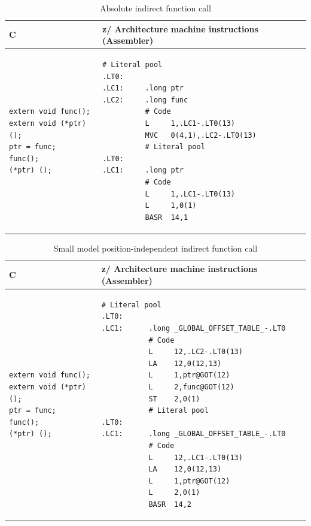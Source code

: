 \documentclass[USenglish,fontsize=11pt,twoside,%
  toc=bib,toc=idx,toc=graduated,numbers=noendperiod,
  bookmarks=true,
  bookmarksnumbered=true,
  bookmarksopen=true,
  bookmarksopenlevel=1,
  breaklinks=true,
  colorlinks=true,
  linkcolor=black,
  pdfpagelayout={TwoPageRight},
  pdfusetitle=true
]{scrreprt}
\newcommand{\ARCH}{z/\kern-1pt Ar\-chi\-tec\-ture}
\newcommand{\ARCH}{ESA/390}
\newenvironment{DIFnomarkup}{}{} %
\begin{document}
\ifzseries\else
\begin{table}
  \centering
  \begin{DIFnomarkup}
  \begin{tabular}{p{}p{}}
    \toprule
    C & \ARCH{} machine instructions (Assembler) \\
    \midrule
\begin{lstlisting}[style=short]
extern void func();
extern void (*ptr)();
ptr = func;
func();
(*ptr) ();
\end{lstlisting}
    &
\begin{lstlisting}[style=short,language=simpleasm]
          # Literal pool
.LT0:
.LC1:     .long ptr
.LC2:     .long func
          # Code
          L     1,.LC1-.LT0(13)
          MVC   0(4,1),.LC2-.LT0(13)
          # Literal pool
.LT0:
.LC1:     .long ptr
          # Code
          L     1,.LC1-.LT0(13)
          L     1,0(1)
          BASR  14,1
\end{lstlisting} \\
  \end{tabular}
  \end{DIFnomarkup}
  \caption{Absolute indirect function call}
  \label{tab:fncallabsindirect}
\end{table}
\fi

\ifzseries\else
\begin{table}
  \centering
  \begin{DIFnomarkup}
  \begin{tabular}{p{}p{}}
    \toprule
    C & \ARCH{} machine instructions (Assembler) \\
    \midrule
\begin{lstlisting}[style=short]
extern void func();
extern void (*ptr)();
ptr = func;
func();
(*ptr) ();
\end{lstlisting}
    &
\begin{lstlisting}[style=short,language=simpleasm]
           # Literal pool
.LT0:
.LC1:      .long _GLOBAL_OFFSET_TABLE_-.LT0
           # Code
           L     12,.LC2-.LT0(13)
           LA    12,0(12,13)
           L     1,ptr@GOT(12)
           L     2,func@GOT(12)
           ST    2,0(1)
           # Literal pool
.LT0:
.LC1:      .long _GLOBAL_OFFSET_TABLE_-.LT0
           # Code
           L     12,.LC1-.LT0(13)
           LA    12,0(12,13)
           L     1,ptr@GOT(12)
           L     2,0(1)
           BASR  14,2
\end{lstlisting} \\
  \end{tabular}
  \end{DIFnomarkup}
  \caption{Small model position-independent indirect function call}
  \label{tab:fncallpicsmall}
\end{table}
\fi
\end{document}
